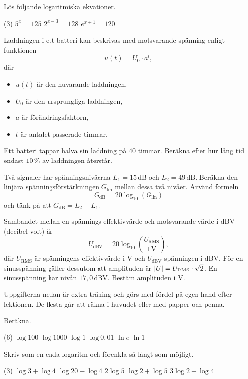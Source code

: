Lös följande logaritmiska ekvationer.
\begin{delar}(3)
  \task $5^x = 125$
  \task $2^{x-3} = 128$
  \task $e^{x+1} = 120$
\end{delar}

Laddningen i ett batteri kan beskrivas med motsvarande spänning enligt funktionen
\[
  u(t) = U_0 \cdot a^t,
\]
där
\begin{itemize}
  \item $u(t)$ är den nuvarande laddningen,
  \item $U_0$ är den ursprungliga laddningen,
  \item $a$ är förändringsfaktorn,
  \item $t$ är antalet passerade timmar.
\end{itemize}
Ett batteri tappar halva sin laddning på $40$ timmar. Beräkna efter hur lång tid endast $10\,\%$
av laddningen återstår.

Två signaler har spänningsnivåerna $L_1 = 15\,\text{dB}$ och $L_2 = 49\,\text{dB}$. Beräkna den
linjära spänningsförstärkningen $G_{\text{lin}}$ mellan dessa två nivåer. Använd formeln
\[
  G_{\text{dB}} = 20\log_{10}(G_{\text{lin}})
\]
och tänk på att $G_{\text{dB}} = L_2 - L_1$.

Sambandet mellan en spännings effektivvärde och motsvarande värde i dBV (decibel volt) är
\[
  U_{\text{dBV}} = 20\log_{10}\left(\frac{U_{\text{RMS}}}{1\,\text{V}}\right),
\]
där $U_{\text{RMS}}$ är spänningens effektivvärde i V och $U_{\text{dBV}}$ spänningen i dBV.
För en sinusspänning gäller dessutom att amplituden är $\lvert U\rvert = U_{\text{RMS}} \cdot \sqrt{2}$.
En sinusspänning har nivån $17{,}0\,\text{dBV}$. Bestäm amplituden i V.

Uppgifterna nedan är extra träning och görs med fördel på egen hand efter lektionen. De flesta går
att räkna i huvudet eller med papper och penna.

Beräkna.
\begin{delar}(6)
  \task $\log 100$
  \task $\log 1000$
  \task $\log 1$
  \task $\log 0{,}01$
  \task $\ln e$
  \task $\ln 1$
\end{delar}

Skriv som en enda logaritm och förenkla så långt som möjligt.
\begin{delar}(3)
  \task $\log 3 + \log 4$
  \task $\log 20 - \log 4$
  \task $2\log 5$
  \task $\log 2 + \log 5$
  \task $3\log 2 - \log 4$
\end{delar}

